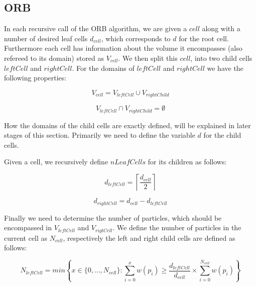 \documentclass[]{article}
\begin{document}
\subsection{ORB}


In each recursive call of the ORB algorithm, we are given a $cell$ along with a number of desired leaf cells $d_{cell}$, which corresponds to $d$ for the root cell. Furthermore each cell has information about the volume it encompasses (also refereed to its domain) stored as $V_{cell}$. We then split this $cell$, into two child cells $leftCell$ and $rightCell$. For the domains of $leftCell$ and $rightCell$ we have the following properties: 

\begin{center}
	\begin{equation}
		V_{cell} = V_{leftCell} \cup V_{rightChild}
	\end{equation}
\end{center}

\begin{center}
	\begin{equation}
		V_{leftCell} \cap V_{rightChild} = \emptyset
	\end{equation}
\end{center}

How the domains of the child cells are exactly defined, will be explained in later stages of this section. Primarily we need to define the variable $d$ for the child cells.

Given a cell, we recursively define $nLeafCells$ for its children as follows:

\begin{center}
	\begin{equation}
		d_{leftCell} = \left \lceil\frac{d_{cell}}{2} \right \rceil 
	\end{equation}
\end{center}

\begin{center}
	\begin{equation}
		d_{rightCell} = d_{cell} - d_{leftCell}
	\end{equation}
\end{center}

Finally we need to determine the number of particles, which should be encompassed in $V_{leftCell}$ and $V_{rigtCell}$. We define the number of particles in the current cell as $N_{cell}$, respectively the left and right child cells are defined as follows:

\begin{center}
	\begin{equation}
		N_{leftCell} = min \left \{ x \in \{0,...,N_{cell} \} : \sum_{i=0}^{x} w(p_i) \geq \frac{d_{leftCell}}{d_{cell}} \times \sum_{i=0}^{N_{cell}} w(p_i) \right \} 
	\end{equation}
\end{center}
\end{document}
